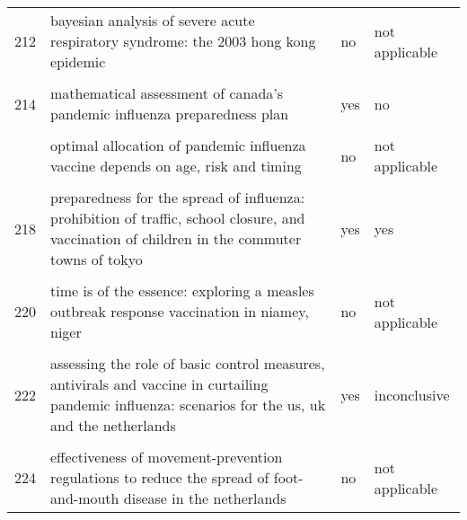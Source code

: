 \documentclass[
]{article}
\begin{document}
\begin{landscape}
\begin{longtable}{l>{\raggedright\arraybackslash}p{4cm}l>{\raggedright\arraybackslash}p{4cm}}
212 & bayesian analysis of severe acute respiratory syndrome: the 2003 hong kong epidemic & no & not applicable\\
\cellcolor{gray!6}{213} & \cellcolor{gray!6}{hepatitis b vaccination and changes in sexual risk behaviour among men who have sex with men in amsterdam} & \cellcolor{gray!6}{no} & \cellcolor{gray!6}{not applicable}\\
214 & mathematical assessment of canada's pandemic influenza preparedness plan & yes & no\\
\cellcolor{gray!6}{215} & \cellcolor{gray!6}{modeling targeted layered containment of an influenza pandemic in the united states} & \cellcolor{gray!6}{no} & \cellcolor{gray!6}{not applicable}\\
\addlinespace
216 & optimal allocation of pandemic influenza vaccine depends on age, risk and timing & no & not applicable\\
\cellcolor{gray!6}{217} & \cellcolor{gray!6}{pandemic simulation of antivirals plus school closures: buying time until strain-specific vaccine is available} & \cellcolor{gray!6}{no} & \cellcolor{gray!6}{not applicable}\\
218 & preparedness for the spread of influenza: prohibition of traffic, school closure, and vaccination of children in the commuter towns of tokyo & yes & yes\\
\cellcolor{gray!6}{219} & \cellcolor{gray!6}{scenarios of diffusion and control of an influenza pandemic in italy} & \cellcolor{gray!6}{yes} & \cellcolor{gray!6}{yes}\\
220 & time is of the essence: exploring a measles outbreak response vaccination in niamey, niger & no & not applicable\\
\addlinespace
\cellcolor{gray!6}{221} & \cellcolor{gray!6}{a stochastic equation-based model of the value of international air-travel restrictions for controlling pandemic flu} & \cellcolor{gray!6}{no} & \cellcolor{gray!6}{not applicable}\\
222 & assessing the role of basic control measures, antivirals and vaccine in curtailing pandemic influenza: scenarios for the us, uk and the netherlands & yes & inconclusive\\
\cellcolor{gray!6}{223} & \cellcolor{gray!6}{deterministic sir (susceptible–infected–removed) models applied to varicella outbreaks} & \cellcolor{gray!6}{yes} & \cellcolor{gray!6}{yes}\\
224 & effectiveness of movement-prevention regulations to reduce the spread of foot-and-mouth disease in the netherlands & no & not applicable\\

\end{longtable}
\end{landscape}
\end{document}
